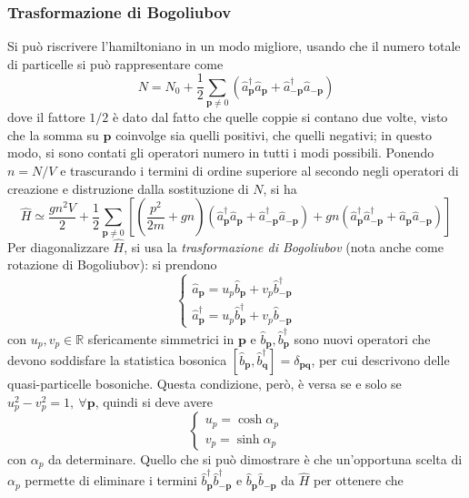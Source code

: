 \documentclass[11pt, a4paper]{scrartcl}
\theoremstyle{style}
\theoremstyle{style1}
\numberwithin{equation}{subsection}
\begin{document}
\subsubsection{Trasformazione di Bogoliubov}
Si pu\`o riscrivere l'hamiltoniano in un modo migliore, usando che il numero totale di particelle si pu\`o rappresentare come
\[
N = N_0 + \frac{1}{2}\sum_{\mathbf{p} \neq 0}^{} \left(\hat{a}^\dagger _\mathbf{p}\hat{a}_\mathbf{p} + \hat{a}^\dagger _{-\mathbf{p}} \hat{a}_{-\mathbf{p} }   \right) 
\] 
dove il fattore $1 / 2$ \`e dato dal fatto che quelle coppie si contano due volte, visto che la somma su $\mathbf{p} $ coinvolge sia quelli positivi, che quelli negativi; in questo modo, si sono contati gli operatori numero in tutti i modi possibili.
Ponendo $n = N / V$ e trascurando i termini di ordine superiore al secondo negli operatori di creazione e distruzione dalla sostituzione di $N$, si ha
\[
	\hat{H}\simeq \frac{gn^2V}{2} + \frac{1}{2}\sum_{\mathbf{p} \neq 0}^{}\left[ \left(\frac{p^2}{2m}+gn\right) \left(\hat{a}^\dagger _{\mathbf{p} } \hat{a}_\mathbf{p} + \hat{a} ^\dagger _{-\mathbf{p} } \hat{a}_{-\mathbf{p} }\right) + gn \left(\hat{a}^\dagger _{\mathbf{p} } \hat{a}^\dagger _{-\mathbf{p} } + \hat{a}_\mathbf{p} \hat{a}_{-\mathbf{p} } \right)  \right] 
\] 
Per diagonalizzare $\hat{H}$, si usa la \textit{trasformazione di Bogoliubov} (nota anche come rotazione di Bogoliubov): si prendono
\begin{equation}\label{apbp}
\begin{cases}
	\hat{a}_\mathbf{p} = u_p \hat{b}_\mathbf{p}  + v_p\hat{b}^\dagger _{-\mathbf{p} } \\
	\hat{a}^\dagger _\mathbf{p} = u_p\hat{b}^\dagger _\mathbf{p} +v_p \hat{b}_{-\mathbf{p} } 
\end{cases}
\end{equation}
con $u_p ,v_p \in \mathbb{R}$ sfericamente simmetrici in $\mathbf{p} $ e $\hat{b}_\mathbf{p} , \hat{b}^\dagger _\mathbf{p} $ sono nuovi operatori che devono soddisfare la statistica bosonica $[\hat{b}_\mathbf{p} ,\hat{b}^\dagger _\mathbf{q} ] = \delta _{\mathbf{p} \mathbf{q} } $, per cui descrivono delle quasi-particelle bosoniche.
Questa condizione, per\`o, \`e versa se e solo se $u^2 _p-v^2_p =1, \ \forall \mathbf{p} $, quindi si deve avere
\[
\begin{cases}
	u_p = \cosh \alpha _p \\
	v_p = \sinh\alpha _{p } 
\end{cases}
\] 
con $\alpha _p$ da determinare.
Quello che si pu\`o dimostrare \`e che un'opportuna scelta di $\alpha _p $ permette di eliminare i termini $\hat{b}^\dagger _{\mathbf{p} } \hat{b}^\dagger _{-\mathbf{p} } $ e $\hat{b}_\mathbf{p} \hat{b}_{-\mathbf{p} } $ da $\hat{H}$ per ottenere che
\end{document}

